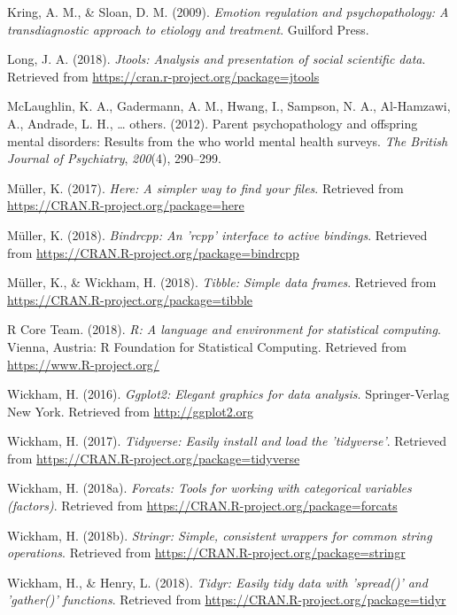\documentclass[man]{apa6}
\begin{document}
\hypertarget{ref-kring2009emotion}{}
Kring, A. M., \& Sloan, D. M. (2009). \emph{Emotion regulation and
psychopathology: A transdiagnostic approach to etiology and treatment}.
Guilford Press.

\hypertarget{ref-R-jtools}{}
Long, J. A. (2018). \emph{Jtools: Analysis and presentation of social
scientific data}. Retrieved from
\url{https://cran.r-project.org/package=jtools}

\hypertarget{ref-mclaughlin2012parent}{}
McLaughlin, K. A., Gadermann, A. M., Hwang, I., Sampson, N. A.,
Al-Hamzawi, A., Andrade, L. H., \ldots{} others. (2012). Parent
psychopathology and offspring mental disorders: Results from the who
world mental health surveys. \emph{The British Journal of Psychiatry},
\emph{200}(4), 290--299.

\hypertarget{ref-R-here}{}
Müller, K. (2017). \emph{Here: A simpler way to find your files}.
Retrieved from \url{https://CRAN.R-project.org/package=here}

\hypertarget{ref-R-bindrcpp}{}
Müller, K. (2018). \emph{Bindrcpp: An 'rcpp' interface to active
bindings}. Retrieved from
\url{https://CRAN.R-project.org/package=bindrcpp}

\hypertarget{ref-R-tibble}{}
Müller, K., \& Wickham, H. (2018). \emph{Tibble: Simple data frames}.
Retrieved from \url{https://CRAN.R-project.org/package=tibble}

\hypertarget{ref-R-base}{}
R Core Team. (2018). \emph{R: A language and environment for statistical
computing}. Vienna, Austria: R Foundation for Statistical Computing.
Retrieved from \url{https://www.R-project.org/}

\hypertarget{ref-R-ggplot2}{}
Wickham, H. (2016). \emph{Ggplot2: Elegant graphics for data analysis}.
Springer-Verlag New York. Retrieved from \url{http://ggplot2.org}

\hypertarget{ref-R-tidyverse}{}
Wickham, H. (2017). \emph{Tidyverse: Easily install and load the
'tidyverse'}. Retrieved from
\url{https://CRAN.R-project.org/package=tidyverse}

\hypertarget{ref-R-forcats}{}
Wickham, H. (2018a). \emph{Forcats: Tools for working with categorical
variables (factors)}. Retrieved from
\url{https://CRAN.R-project.org/package=forcats}

\hypertarget{ref-R-stringr}{}
Wickham, H. (2018b). \emph{Stringr: Simple, consistent wrappers for
common string operations}. Retrieved from
\url{https://CRAN.R-project.org/package=stringr}

\hypertarget{ref-R-tidyr}{}
Wickham, H., \& Henry, L. (2018). \emph{Tidyr: Easily tidy data with
'spread()' and 'gather()' functions}. Retrieved from
\url{https://CRAN.R-project.org/package=tidyr}
\end{document}
